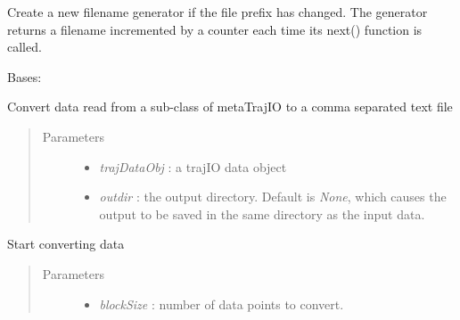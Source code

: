\documentclass[letterpaper,10pt,english]{sphinxmanual}
\begin{document}

\begin{fulllineitems}
\label{api-doc/mosaic:mosaic.ConvertToCSV.ConvertToCSV._creategenerator}
Create a new filename generator if the file prefix has changed. 
The generator returns a filename incremented by a counter each time 
its next() function is called.

\end{fulllineitems}


\begin{fulllineitems}
\label{api-doc/mosaic:mosaic.ConvertToCSV.ConvertToCSV}
Bases: \href{http://docs.python.org/library/functions.html\#object}{}

Convert data read from a sub-class of metaTrajIO to a comma separated text file
\begin{quote}\begin{description}
\item[{Parameters}] \leavevmode\begin{itemize}
\item {} 
\emph{trajDataObj} : a trajIO data object

\item {} 
\emph{outdir} : the output directory. Default is \emph{None}, which causes the output to be saved in the same directory as the input data.

\end{itemize}

\end{description}\end{quote}

\begin{fulllineitems}
\label{api-doc/mosaic:mosaic.ConvertToCSV.ConvertToCSV.Convert}
Start converting data
\begin{quote}\begin{description}
\item[{Parameters}] \leavevmode\begin{itemize}
\item {} 
\emph{blockSize} : number of data points to convert.

\end{itemize}

\end{description}\end{quote}

\end{fulllineitems}


\end{fulllineitems}
\end{document}
